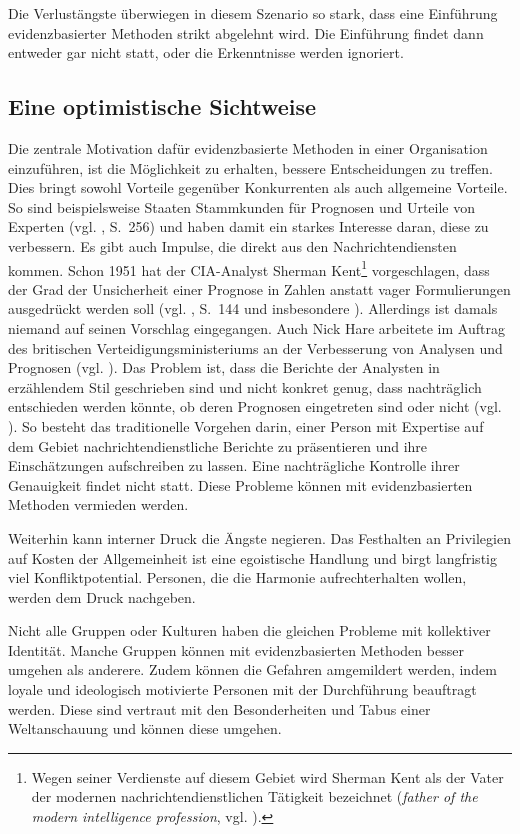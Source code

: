 Die Verlustängste überwiegen in diesem Szenario so stark, dass eine Einführung
evidenzbasierter Methoden strikt abgelehnt wird. Die Einführung findet dann
entweder gar nicht statt, oder die Erkenntnisse werden ignoriert.

\subsection{Eine optimistische Sichtweise}

Die zentrale Motivation dafür evidenzbasierte Methoden in einer Organisation
einzuführen, ist die Möglichkeit zu erhalten, bessere Entscheidungen zu treffen.
Dies bringt sowohl Vorteile gegenüber Konkurrenten als auch allgemeine Vorteile. So sind beispielsweise Staaten Stammkunden
für Prognosen und Urteile von Experten (vgl. \cite{Roetheli}, S.~256) und haben damit ein
starkes Interesse daran, diese zu verbessern. Es gibt auch Impulse, die direkt aus den Nachrichtendiensten
kommen. Schon 1951 hat der CIA-Analyst Sherman Kent\footnote{
Wegen seiner Verdienste auf diesem Gebiet wird Sherman Kent als der Vater der modernen
nachrichtendienstlichen Tätigkeit bezeichnet (\emph{father of the modern intelligence profession},
vgl. \cite{Ford}).
} vorgeschlagen, dass der Grad der Unsicherheit einer Prognose in Zahlen anstatt vager Formulierungen
ausgedrückt werden soll (vgl. \cite{Roche}, S.~144 und insbesondere \cite{Kent}).
Allerdings ist damals niemand auf seinen Vorschlag eingegangen. Auch Nick Hare
arbeitete im Auftrag des britischen Verteidigungsministeriums an der Verbesserung von Analysen und
Prognosen (vgl. \cite{Burton}). Das Problem ist, dass die Berichte der Analysten in erzählendem Stil
geschrieben sind und nicht konkret genug, dass nachträglich entschieden werden könnte, ob deren Prognosen
eingetreten sind oder nicht (vgl. \cite{Burton}). So besteht das traditionelle Vorgehen darin, einer
Person mit Expertise auf dem Gebiet nachrichtendienstliche Berichte zu präsentieren und ihre Einschätzungen
aufschreiben zu lassen. Eine nachträgliche Kontrolle ihrer Genauigkeit findet nicht statt. Diese Probleme
können mit evidenzbasierten Methoden vermieden werden.

Weiterhin kann interner Druck die Ängste negieren.
Das Festhalten an Privilegien auf Kosten der Allgemeinheit ist eine
egoistische Handlung und birgt langfristig viel Konfliktpotential. Personen, die die
Harmonie aufrechterhalten wollen, werden dem Druck nachgeben. 

Nicht alle Gruppen oder Kulturen haben die gleichen Probleme mit kollektiver Identität.
Manche Gruppen können mit evidenzbasierten Methoden besser umgehen als anderere.
Zudem können die Gefahren amgemildert werden, indem loyale und ideologisch motivierte
Personen mit der Durchführung beauftragt werden. Diese sind vertraut mit den
Besonderheiten und Tabus einer Weltanschauung und können diese umgehen.

